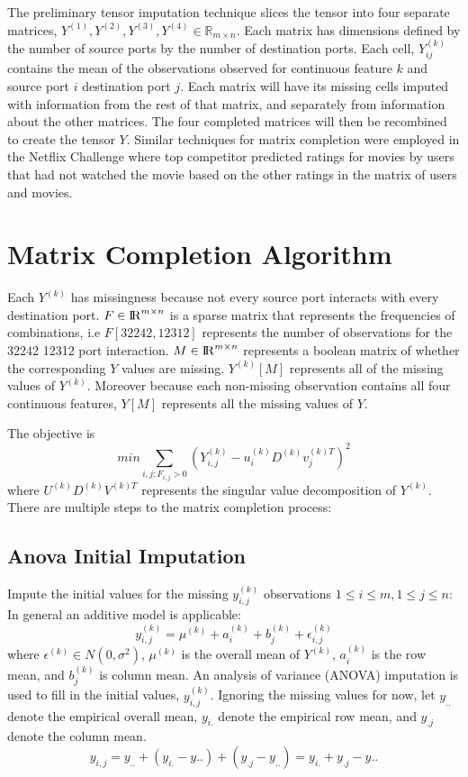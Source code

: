 \documentclass[12pt,twoside]{dukestatscithesis}
\theoremstyle{definition}
\theoremstyle{definition}
\theoremstyle{definition}
\theoremstyle{remark}
\begin{document}
The preliminary tensor imputation technique slices the tensor into four
separate matrices,
\(Y^{(1)}, Y^{(2)}, Y^{(3)}, Y^{(4)} \in \mathbb{R}_{m \times n}\). Each
matrix has dimensions defined by the number of source ports by the
number of destination ports. Each cell, \(Y^{(k)}_{ij}\) contains the
mean of the observations observed for continuous feature \(k\) and
source port \(i\) destination port \(j\). Each matrix will have its
missing cells imputed with information from the rest of that matrix, and
separately from information about the other matrices. The four completed
matrices will then be recombined to create the tensor \(Y\). Similar
techniques for matrix completion were employed in the Netflix Challenge
where top competitor predicted ratings for movies by users that had not
watched the movie based on the other ratings in the matrix of users and
movies.

\section{Matrix Completion Algorithm}\label{matrix-completion-algorithm}

Each \(Y^{(k)}\) has missingness because not every source port interacts
with every destination port. \(F \in {\rm I\!R}^{m \times n}\) is a
sparse matrix that represents the frequencies of combinations, i.e
\(F[32242,12312]\) represents the number of observations for the 32242
12312 port interaction. \(M \in {\rm I\!R}^{m \times n}\) represents a
boolean matrix of whether the corresponding \(Y\) values are missing.
\(Y^{(k)}[M]\) represents all of the missing values of \(Y^{(k)}\).
Moreover because each non-missing observation contains all four
continuous features, \(Y[M]\) represents all the missing values of
\(Y\).

The objective is
\[min \sum_{i,j:F_{i,j} > 0} (Y^{(k)}_{i,j} - u^{(k)}_iD^{(k)}v^{(k)T}_j)^2\]
where \(U^{(k)}D^{(k)}V^{(k)T}\) represents the singular value
decomposition of \(Y^{(k)}\). There are multiple steps to the matrix
completion process:

\subsection{Anova Initial Imputation}\label{anova-initial-imputation}

Impute the initial values for the missing \(y^{(k)}_{i,j}\) observations
\(1 \leq i \leq m, 1 \leq j \leq n\): In general an additive model is
applicable:
\[y^{(k)}_{i,j} = \mu^{(k)} + a^{(k)}_i + b^{(k)}_j + \epsilon^{(k)}_{i,j}\]
where \(\epsilon^{(k)} \in N(0,\sigma^2)\), \(\mu^{(k)}\) is the overall
mean of \(Y^{(k)}\), \(a^{(k)}_i\) is the row mean, and \(b^{(k)}_j\) is
column mean. An analysis of variance (ANOVA) imputation is used to fill
in the initial values, \(y^{(k)}_{i,j}\). Ignoring the missing values
for now, let \(y_{..}\) denote the empirical overall mean, \(y_{i.}\)
denote the empirical row mean, and \(y_{.j}\) denote the column mean.
\[y_{i,j} = y_{..} + (y_{i.}-y{..}) + (y_{.j}-y_{..}) = y_{i.} + y_{.j} - y{..}\]
\end{document}
